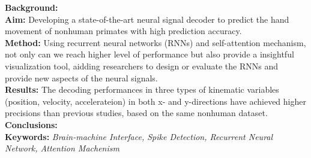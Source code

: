 \noindent
\textbf{Background:}
\\
\textbf{Aim:}
Developing a state-of-the-art neural signal decoder to predict the hand movement of nonhuman primates with high prediction accuracy.
\\
\textbf{Method:}
Using recurrent neural networks (RNNs) and self-attention mechanism, not only can we reach higher level of performance but also provide a insightful visualization tool, 
aidding researchers to design or evaluate the RNNs and provide new aspects of the neural signals.
\\
\textbf{Results:}
The decoding performances in three types of kinematic variables (position, velocity, accelerateion) in both x- and y-directions have achieved higher precisions than previous studies, based on the same nonhuman dataset.
\\
\textbf{Conclusions:}
\\
\textbf{Keywords:}
\textit{Brain-machine Interface, Spike Detection, Recurrent Neural Network, Attention Machenism}